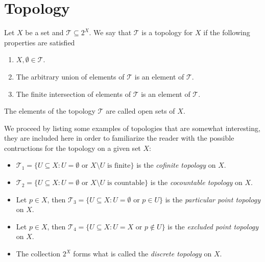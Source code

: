 \section{Topology}

\begin{definition}[Topology]\label{def:topology}
Let \(X\) be a set and \(\mathcal T \subseteq 2^X\). We say that \(\mathcal T\)
is a topology for \(X\) if the following properties are satisfied
\begin{enumerate}[(T1)]\setlength\itemsep{0em}
\item\label{item:topology-T1}
  \(X, \emptyset \in \mathcal T\).

\item\label{item:topology-T2}
  The arbitrary union of elements of \(\mathcal T\) is an element of
  \(\mathcal T\).

\item\label{item:topology-T3}
  The finite intersection of elements of \(\mathcal T\) is an element of
  \(\mathcal T\).
\end{enumerate}
The elements of the topology \(\mathcal T\) are called open sets of \(X\).
\end{definition}

\begin{example}\label{exp:some-topologies}
We proceed by listing some examples of topologies that are somewhat interesting,
they are included here in order to familiarize the reader with the possible
contructions for the topology on a given set \(X\):
\begin{itemize}\setlength\itemsep{0em}
\item \(\mathcal T_1 = \{U \subseteq X \colon U = \emptyset \text{ or
  } X \setminus U \text{ is finite}\}\) is the \emph{cofinite topology} on \(X\).

\item \(\mathcal T_2 = \{U \subseteq X \colon U = \emptyset \text{ or } X \setminus U
  \text{ is countable}\}\) is the \emph{cocountable topology} on \(X\).

\item Let \(p \in X\), then \(\mathcal T_3 = \{U \subseteq X \colon U = \emptyset
  \text{ or } p \in U\}\) is the \emph{particular point topology} on \(X\).

\item Let \(p \in X\), then \(\mathcal T_4 = \{U \subseteq X \colon U = X \text{ or }
  p \not\in U\}\) is the \emph{excluded point topology} on \(X\).
\item The collection \(2^X\) forms what is called the \emph{discrete topology}
  on \(X\).
\end{itemize}
\end{example}

